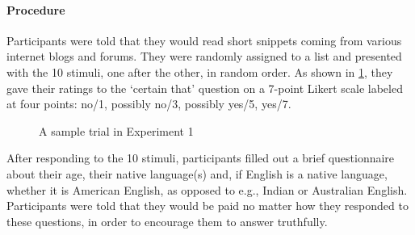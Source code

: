 \documentclass[11pt,fleqn]{article}
\newcommand{\6}{\mbox{$[\hspace*{-.6mm}[$}}
\newcommand{\9}{\mbox{$]\hspace*{-.6mm}]$}}
\begin{document}
\paragraph{Procedure} Participants were told that they would read short snippets coming from various internet blogs and forums. They were randomly assigned to a list and presented with the 10 stimuli, one after the other, in random order. As shown in \ref{f-corpus-trial}, they gave their ratings to the `certain that' question on a 7-point Likert scale labeled at four points: no/1, possibly no/3, possibly yes/5, yes/7.

\begin{figure}[h!]
\begin{center}
\end{center}
\caption{A sample trial in Experiment 1}\label{f-corpus-trial}
\end{figure}

After responding to the 10 stimuli, 
participants filled out a brief questionnaire about their age, their
native language(s) and, if English is a native language, whether it is
American English, as opposed to e.g., Indian or Australian English.
Participants were told that they would be paid no matter how they
responded to these questions, in order to encourage them to answer
truthfully. 
\end{document}
